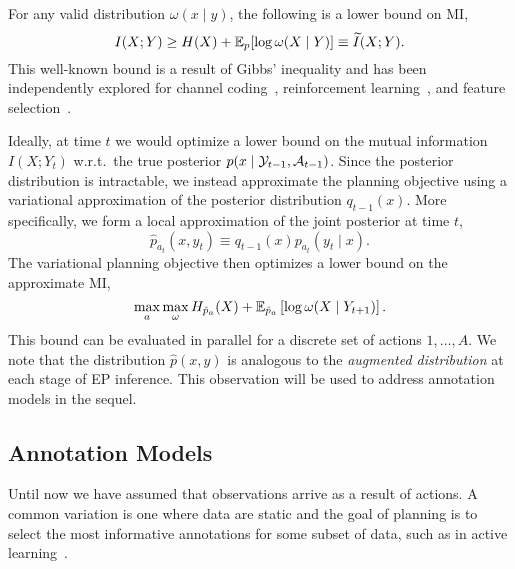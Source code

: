 For any valid distribution $\omega(x\mid y)$, the following is a lower
bound on MI,
\begin{equation}\label{eq:varmi}
  I(X;Y) \geq H(X) + \mathbb{E}_p[ \log \omega(X\mid Y) ] \equiv \widetilde{I}(X;Y).
\end{equation}
This well-known bound is a result of Gibbs' inequality and has been
independently explored for channel coding~\citep{agakov2004algorithm},
reinforcement learning~\citep{mohamed2015variational}, and feature
selection~\citep{gao2016variational, chen2018learning}.


Ideally, at time $t$ we would optimize a lower bound on the mutual
information $I(X;Y_t)$ w.r.t.~the true posterior $p(x \mid
\mathcal{Y}_{t-1}, \mathcal{A}_{t-1})$.  Since the posterior distribution is
intractable, we instead approximate the planning objective using a
variational approximation of the posterior distribution $q_{t-1}(x)$.
More specifically, we form a local approximation of the joint
posterior at time $t$,
\begin{equation}\label{eq:local_approx}
  \hat{p}_{a_t}(x,y_t) \equiv q_{t-1}(x) p_{a_t}(y_t \mid x).
\end{equation}
The variational planning objective then optimizes a lower bound on the
approximate MI,
\begin{equation}\label{eq:varmi_approx}
  \max_a \max_\omega H_{\hat{p}_a}(X) + \mathbb{E}_{\hat{p}_a}\left[ \log \omega(X \mid Y_{t+1})
  \right].
\end{equation}
This bound can be evaluated in parallel for a discrete set of actions
$1,\ldots,A$.  We note that the distribution $\hat{p}(x,y)$ is
analogous to the \emph{augmented distribution} at each stage of EP
inference.  This observation will be used to address annotation models
in the sequel.

\subsection{Annotation Models}

Until now we have assumed that observations arrive as a result of
actions.  A common variation is one where data are static and the goal
of planning is to select the most informative annotations for some
subset of data, such as in active learning~\citep{settles2012active}.


